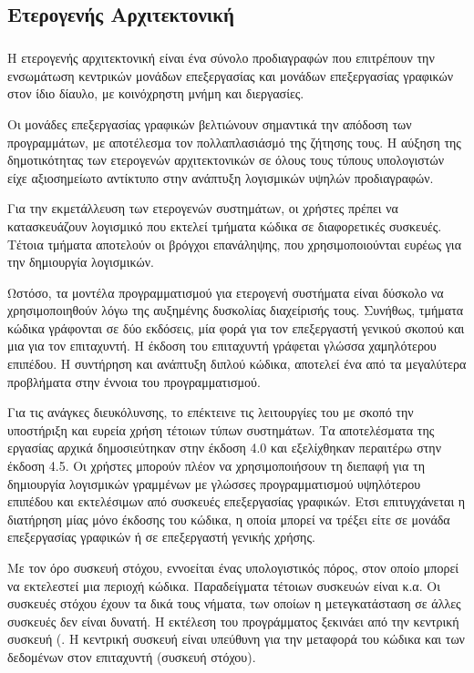 \subsection{Ετερογενής Αρχιτεκτονική}
\subparagraph{}
Η ετερογενής αρχιτεκτονική είναι ένα σύνολο προδιαγραφών που επιτρέπουν την ενσωμάτωση κεντρικών μονάδων επεξεργασίας  \emph{} και μονάδων επεξεργασίας γραφικών στον ίδιο δίαυλο, με κοινόχρηστη μνήμη και διεργασίες\cite{toms_hardware}.

Οι μονάδες επεξεργασίας γραφικών βελτιώνουν σημαντικά την απόδοση των προγραμμάτων, με αποτέλεσμα τον πολλαπλασιάσμό της ζήτησης τους. Η αύξηση της δημοτικότητας των ετερογενών αρχιτεκτονικών σε όλους τους τύπους υπολογιστών είχε αξιοσημείωτο αντίκτυπο στην ανάπτυξη λογισμικών υψηλών προδιαγραφών.

Για την εκμετάλλευση των ετερογενών συστημάτων, οι χρήστες πρέπει να κατασκευάζουν λογισμικό που εκτελεί τμήματα κώδικα σε διαφορετικές συσκευές. Τέτοια τμήματα αποτελούν οι βρόγχοι επανάληψης, που χρησιμοποιούνται ευρέως για την δημιουργία λογισμικών.

Ωστόσο, τα μοντέλα προγραμματισμού για ετερογενή συστήματα είναι δύσκολο να χρησιμοποιηθούν λόγω της αυξημένης δυσκολίας διαχείρισής τους. Συνήθως, τμήματα κώδικα γράφονται σε δύο εκδόσεις, μία φορά για τον επεξεργαστή γενικού σκοπού και μια για τον επιταχυντή. Η έκδοση του επιταχυντή γράφεται γλώσσα χαμηλότερου επιπέδου. Η συντήρηση και ανάπτυξη διπλού κώδικα, αποτελεί ένα από τα μεγαλύτερα προβλήματα στην έννοια του προγραμματισμού.

Για τις ανάγκες διευκόλυνσης, το \emph{} επέκτεινε τις λειτουργίες του με σκοπό την υποστήριξη και ευρεία χρήση τέτοιων τύπων συστημάτων\cite{barbara}. Τα αποτελέσματα της εργασίας αρχικά δημοσιεύτηκαν στην έκδοση 4.0 και εξελίχθηκαν περαιτέρω στην έκδοση 4.5. Οι χρήστες μπορούν πλέον να χρησιμοποιήσουν τη διεπαφή για τη δημιουργία λογισμικών γραμμένων με γλώσσες προγραμματισμού υψηλότερου επιπέδου και εκτελέσιμων από συσκευές επεξεργασίας γραφικών. Ετσι επιτυγχάνεται η διατήρηση μίας μόνο έκδοσης του κώδικα, η οποία μπορεί να τρέξει είτε σε μονάδα επεξεργασίας γραφικών ή σε επεξεργαστή γενικής χρήσης\emph{}.

Με τον όρο συσκευή στόχου, εννοείται ένας υπολογιστικός πόρος, στον οποίο μπορεί να εκτελεστεί μια περιοχή κώδικα. Παραδείγματα τέτοιων συσκευών είναι \emph{} κ.α. Οι συσκευές στόχου έχουν τα δικά τους νήματα, των οποίων η μετεγκατάσταση σε άλλες συσκευές δεν είναι δυνατή. Η εκτέλεση του προγράμματος ξεκινάει από την κεντρική συσκευή (\emph{}. Η κεντρική συσκευή είναι υπεύθυνη για την μεταφορά του κώδικα και των δεδομένων στον επιταχυντή (συσκευή στόχου).

